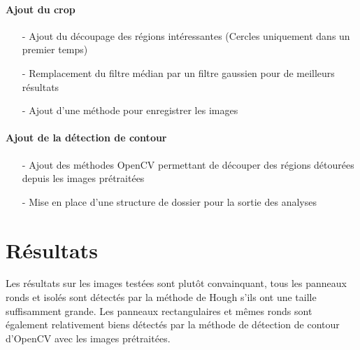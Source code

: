 \documentclass[a4paper,10pt,openany,oneside]{report}
\begin{document}
\subsubsection{Ajout du crop}
\begin{itemize}
\item[-] Ajout du découpage des régions intéressantes (Cercles uniquement dans un premier temps)
\item[-] Remplacement du filtre médian par un filtre gaussien pour de meilleurs résultats
\item[-] Ajout d'une méthode pour enregistrer les images
\end{itemize}

\subsubsection{Ajout de la détection de contour}
\begin{itemize}
\item[-] Ajout des méthodes OpenCV permettant de découper des régions détourées depuis les images prétraitées
\item[-] Mise en place d'une structure de dossier pour la sortie des analyses
\end{itemize}

\chapter{Résultats}
Les résultats sur les images testées sont plutôt convainquant, tous les panneaux ronds et isolés sont détectés par la méthode de Hough s'ils ont une taille suffisamment grande.
Les panneaux rectangulaires et mêmes ronds sont également relativement biens détectés par la méthode de détection de contour d'OpenCV avec les images prétraitées.
\end{document}
